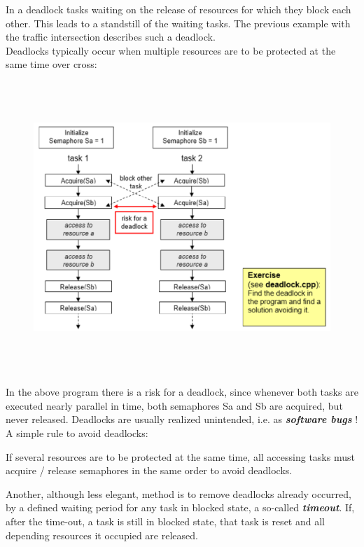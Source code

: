 In a deadlock tasks waiting on the release of resources for which they block each other. This leads to a standstill of the waiting tasks. The previous example with the traffic intersection describes such a deadlock.\\

Deadlocks typically occur when multiple resources are to be protected at the same time over cross:

 	\begin{figure}[h]
    \centering
    \includegraphics[width=12cm, height=11cm]{Images/image108.png}
    \label{fig:Fig }
    \end{figure}

In the above program there is a risk for a deadlock, since whenever both tasks are executed nearly parallel in time, both semaphores Sa and Sb are acquired, but never released. Deadlocks are usually realized unintended, i.e. as \textbf{\textit{software bugs}} !\\

A simple rule to avoid deadlocks:

\begin{tcolorbox}[colback=blue!5!white,colframe=blue!75!black]
	If several resources are to be protected at the same time, all accessing tasks must acquire / release semaphores in the same order to avoid deadlocks.
\end{tcolorbox}

Another, although less elegant, method is to remove deadlocks already occurred, by a defined waiting period for any task in blocked state, a so-called \textbf{\textit{timeout}}. If, after the time-out, a task is still in blocked state, that task is reset and all depending resources it occupied are released.\\

